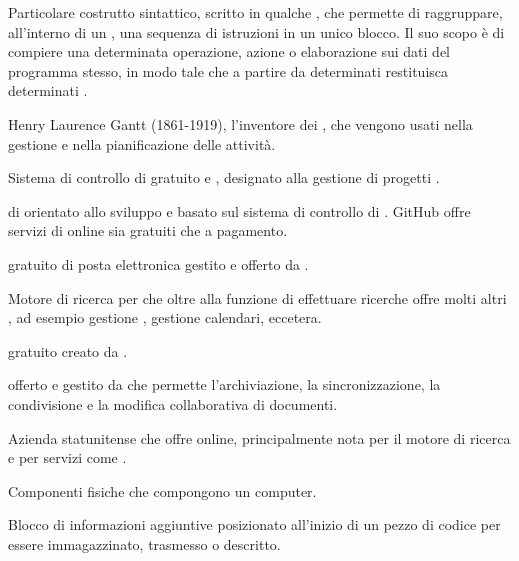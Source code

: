 {Particolare costrutto sintattico, scritto in qualche , che permette di raggruppare, all'interno di un , una sequenza di istruzioni in un unico blocco. Il suo scopo è di compiere una determinata operazione, azione o elaborazione sui dati del programma stesso, in modo tale che a partire da determinati  restituisca determinati .}




{Henry Laurence Gantt (1861-1919), l'inventore dei , che vengono usati nella gestione e nella pianificazione delle attività.}

{Sistema di controllo di   gratuito e , designato alla gestione di progetti .}

{ di   orientato allo sviluppo  e basato sul sistema di controllo di  . GitHub offre servizi di  online sia gratuiti che a pagamento.}

{ gratuito di posta elettronica gestito e offerto da .}

{Motore di ricerca per  che oltre alla funzione di effettuare ricerche offre molti altri , ad esempio gestione , gestione calendari, eccetera.} 

{ gratuito creato da .}

{ offerto e gestito da  che permette l'archiviazione, la sincronizzazione, la condivisione e la modifica collaborativa di documenti.}

{Azienda statunitense che offre  online, principalmente nota per il motore di ricerca  e per servizi come .}




{Componenti fisiche che compongono un computer.}

{Blocco di informazioni aggiuntive posizionato all'inizio di un pezzo di codice per essere immagazzinato, trasmesso o descritto.}

